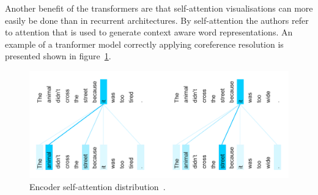 Another benefit of the transformers are that self-attention visualisations can more easily be done than in recurrent architectures.
By self-attention the authors refer to attention that is used to generate context aware word representations.
An example of a tranformer model correctly applying coreference resolution is presented shown in figure~\ref{fig:coreference_resolution}.

\begin{figure}[htbp]
    \begin{center}
        \includegraphics[width=\textwidth]{figures/coreference_resolution.png}
    \end{center}
    \caption{Encoder self-attention distribution~\citep{uszkoreit2017}.}
    \label{fig:coreference_resolution}
\end{figure}

